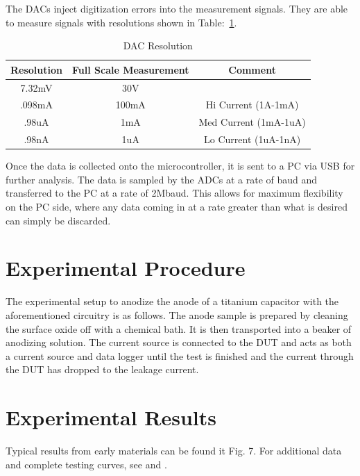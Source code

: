 \documentclass[journal]{IEEEtran}
\begin{document}
    The DACs inject digitization errors into the measurement signals. They are able to measure signals with resolutions shown in Table:~\ref{tab:dacRes}.


    \begin{table}[here]
    \renewcommand{\arraystretch}{1.3}
    \caption{DAC Resolution}
    \label{tab:dacRes}
    \centering
    \begin{tabular}{c||c||c}
    \hline
    \bfseries Resolution & \bfseries Full Scale Measurement & \bfseries Comment\\
        \hline\hline
        7.32mV & 30V & \\
            \hline\hline
            .098mA & 100mA & Hi Current (1A-1mA)\\
                \hline\hline
                .98uA & 1mA & Med Current (1mA-1uA) \\
                    \hline\hline
                    .98nA & 1uA & Lo Current (1uA-1nA)\\
                        \hline
                        \end{tabular}
                        \end{table}

                        Once the data is collected onto the microcontroller, it is sent to a PC via USB for further analysis. The data is sampled by the ADCs at a rate of baud and transferred to the PC at a rate of 2Mbaud. This allows for maximum flexibility on the PC side, where any data coming in at a rate greater than what is desired can simply be discarded.

                        \section{Experimental Procedure}
                        The experimental setup to anodize the anode of a titanium capacitor with the aforementioned circuitry is as follows. The anode sample is prepared by cleaning the surface oxide off with a chemical bath. It is then transported into a beaker of anodizing solution. The current source is connected to the DUT and acts as both a current source and data logger until the test is finished and the current through the DUT has dropped to the leakage current.

                        \section{Experimental Results}
                        Typical results from early materials can be found it Fig. 7. For additional data and complete testing curves, see \cite{sThesis} and \cite{mThesis}.
\end{document}
